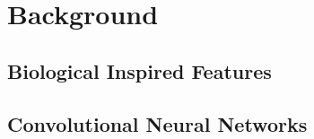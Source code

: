 \chapter{Background}

\section{Biological Inspired Features}

\section{Convolutional Neural Networks}
